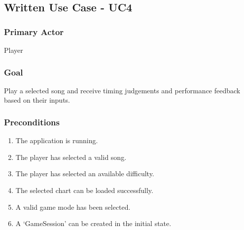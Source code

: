 \documentclass[12pt,a4paper]{article}
\begin{document}
        \subsection{Written Use Case - UC4}
            \subsubsection{Primary Actor}
                Player
            
            \subsubsection{Goal}
                Play a selected song and receive timing judgements and performance feedback based on their inputs.
            
            \subsubsection{Preconditions}
                \begin{enumerate}
                    \item The application is running.
                    \item The player has selected a valid song.
                    \item The player has selected an available difficulty.
                    \item The selected chart can be loaded successfully.
                    \item A valid game mode has been selected.
                    \item A `GameSession' can be created in the initial state.
                \end{enumerate}
            
\end{document}
